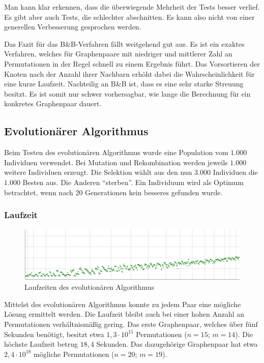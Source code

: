 Man kann klar erkennen, dass die überwiegende Mehrheit der Tests besser verlief. Es 
gibt aber auch Tests, die schlechter abschnitten. Es kann also nicht von einer 
generellen Verbesserung gesprochen werden. 

Das Fazit für das B\&B-Verfahren fällt weitgehend gut aus. Es ist ein exaktes Verfahren, 
welches für Graphenpaare mit niedriger und mittlerer Zahl an Permutationen in der 
Regel schnell zu einem Ergebnis führt. Das Vorsortieren der Knoten nach der Anzahl 
ihrer Nachbarn erhöht dabei die Wahrscheinlichkeit für eine kurze Laufzeit. Nachteilig 
an B\&B ist, dass es eine sehr starke Streuung besitzt. Es ist somit nur schwer 
vorhersagbar, wie lange die Berechnung für ein konkretes Graphenpaar dauert. 

\subsection{Evolutionärer Algorithmus}

Beim Testen des evolutionären Algorithmus wurde eine Population vom $1.000$ Individuen 
verwendet. Bei Mutation und Rekombination werden jeweils $1.000$ weitere Individuen 
erzeugt. Die Selektion wählt aus den nun $3.000$ Individuen die $1.000$ Besten aus. Die 
Anderen "`sterben"'. Ein Individuum wird als Optimum betrachtet, wenn nach 20 
Generationen kein besseres gefunden wurde. 

\subsubsection{Laufzeit}

\begin{figure}[htb]
\centering
\noindent\includegraphics[width=\linewidth,height=\textheight,
keepaspectratio]{bilder/evo}
\caption{Laufzeiten des evolutionären Algorithmus}
\label{pic:evo}
\end{figure}

Mittelst des evolutionären Algorithmus konnte zu jedem Paar eine 
mögliche Lösung ermittelt werden. Die Laufzeit bleibt auch bei einer hohen Anzahl 
an Permutationen verhältnismäßig gering. Das erste Graphenpaar, welches über fünf 
Sekunden benötigt, besitzt etwa $1{,}3 \cdot 10^{15}$ Permutationen ($n=15$; $m=14$). 
Die höchste Laufzeit betrug $18{,}4$ Sekunden. Das dazugehörige Graphenpaar hat etwa 
$2{,}4 \cdot 10^{18}$ mögliche Permutationen ($n=20$; $m=19$). 
 
